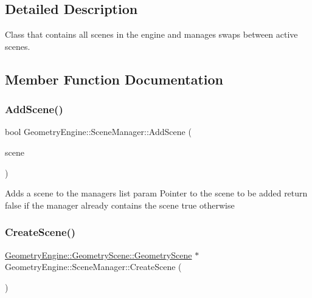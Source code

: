 \subsection{Detailed Description}
Class that contains all scenes in the engine and manages swaps between active scenes. 

\subsection{Member Function Documentation}
\mbox{\label{class_geometry_engine_1_1_scene_manager_afc4e192e195a131efe932048a8d68404}} 
\subsubsection{\texorpdfstring{AddScene()}{AddScene()}}
{\footnotesize\ttfamily bool Geometry\+Engine\+::\+Scene\+Manager\+::\+Add\+Scene (\begin{DoxyParamCaption}\item[{\mbox{\hyperlink{class_geometry_engine_1_1_geometry_scene_1_1_geometry_scene}{Geometry\+Scene\+::\+Geometry\+Scene}} $\ast$}]{scene }\end{DoxyParamCaption})}

Adds a scene to the manager\textquotesingle{}s list param Pointer to the scene to be added return false if the manager already contains the scene true otherwise \mbox{\label{class_geometry_engine_1_1_scene_manager_aafc212a0eed6a49d411d06f03a73f943}} 
\subsubsection{\texorpdfstring{CreateScene()}{CreateScene()}\hspace{0.1cm}{\footnotesize\ttfamily [1/2]}}
{\footnotesize\ttfamily \mbox{\hyperlink{class_geometry_engine_1_1_geometry_scene_1_1_geometry_scene}{Geometry\+Engine\+::\+Geometry\+Scene\+::\+Geometry\+Scene}} $\ast$ Geometry\+Engine\+::\+Scene\+Manager\+::\+Create\+Scene (\begin{DoxyParamCaption}{ }\end{DoxyParamCaption})}

